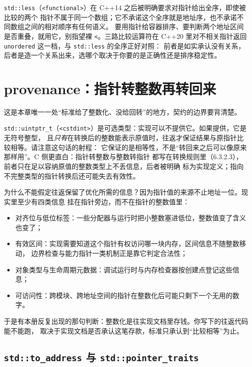 \documentclass[12pt,a4paper,fontset=fandol]{ctexbook}
\newcommand{\cpp}[1]{C++#1}
\newcommand{\Tp}[1]{\texttt{#1}}
\newcommand{\Lang}[1]{\textsf{#1}}
\newcommand{\CL}{\Lang{C}}
\newcommand{\Clause}[1]{\textsc{\small #1}}
\newcommand{\Hdr}[1]{\texttt{<#1>}}
\begin{document}
\Tp{std::less}（\Hdr{functional}）在 \cpp{14} 之后被明确要求对指针给出全序，即使被比较的两个
指针不属于同一个数组；它不承诺这个全序就是地址序，也不承诺不同数组之间的相对顺序有任何语义。
要用指针给容器排序、要判断两个地址区间是否重叠，就用它，别指望裸 \Tp{<}。三路比较运算符在
\cpp{20} 里对不相关指针返回 \Tp{unordered} 这一档，与 \Tp{std::less} 的全序正好对照：
前者是如实承认没有关系，后者是造一个关系出来，选哪个取决于你要的是正确性还是排序稳定性。

\section{provenance：指针转整数再转回来}\label{sec:ub05-prov}

这是本章唯一一处“标准给了整数化、没给回转”的地方，契约的边界要背清楚。

\Tp{std::uintptr\_t}（\Hdr{cstdint}）是可选类型：实现可以不提供它。如果提供，它是无符号整型，
且\emph{只有}在转换后的整数能表示原值时，往返才保证结果与原指针比较相等。请注意这句话的射程：
它保证的是相等性，不是“转回来之后可以像原来那样用”。\CL{} 侧更直白：指针转整数与整数转指针
都写在转换规则里（\Clause{6.3.2.3}），前者只在足以容纳原值的整数类型上不丢信息，后者被明确
标为实现定义；指向不完整类型的指针转换后还可能失去有效性。

为什么不能假定往返保留了优化所需的信息？因为指针值的来源不止地址一位。现实里至少有四类信息
挂在指针旁边，而不在指针的整数值里：

\begin{itemize}
\item 对齐位与低位标签：一些分配器与运行时把小整数塞进低位，整数值变了含义也变了；
\item 有效区间：实现需要知道这个指针有权访问哪一块内存，区间信息不随整数移动，
      边界检查与能力指针一类机制正是靠它判定合法性；
\item 对象类型与生命周期元数据：调试运行时与内存检查器按创建点登记这些信息；
\item 可访问性：跨模块、跨地址空间的指针在整数化后可能只剩下一个无用的数字。
\end{itemize}

于是有本册反复出现的那句判断：整数化是往实现文档里存钱。你写下的往返代码能不能跑，
取决于实现文档是否承认这笔存款，标准只承认到“比较相等”为止。

\subsection{\Tp{std::to\_address} 与 \Tp{std::pointer\_traits}}\label{sec:ub05-toaddr}
\end{document}

